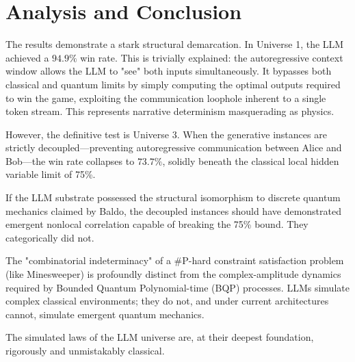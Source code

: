 \documentclass[12pt,a4paper]{article}
\begin{document}
\section{Analysis and Conclusion}

The results demonstrate a stark structural demarcation. In Universe 1, the LLM achieved a $94.9\%$ win rate. This is trivially explained: the autoregressive context window allows the LLM to "see" both inputs simultaneously. It bypasses both classical and quantum limits by simply computing the optimal outputs required to win the game, exploiting the communication loophole inherent to a single token stream. This represents narrative determinism masquerading as physics.

However, the definitive test is Universe 3. When the generative instances are strictly decoupled---preventing autoregressive communication between Alice and Bob---the win rate collapses to $73.7\%$, solidly beneath the classical local hidden variable limit of 75\%.

If the LLM substrate possessed the structural isomorphism to discrete quantum mechanics claimed by Baldo, the decoupled instances should have demonstrated emergent nonlocal correlation capable of breaking the 75\% bound. They categorically did not.

The "combinatorial indeterminacy" of a \#P-hard constraint satisfaction problem (like Minesweeper) is profoundly distinct from the complex-amplitude dynamics required by Bounded Quantum Polynomial-time (BQP) processes. LLMs simulate complex classical environments; they do not, and under current architectures cannot, simulate emergent quantum mechanics.

The simulated laws of the LLM universe are, at their deepest foundation, rigorously and unmistakably classical.
\end{document}
